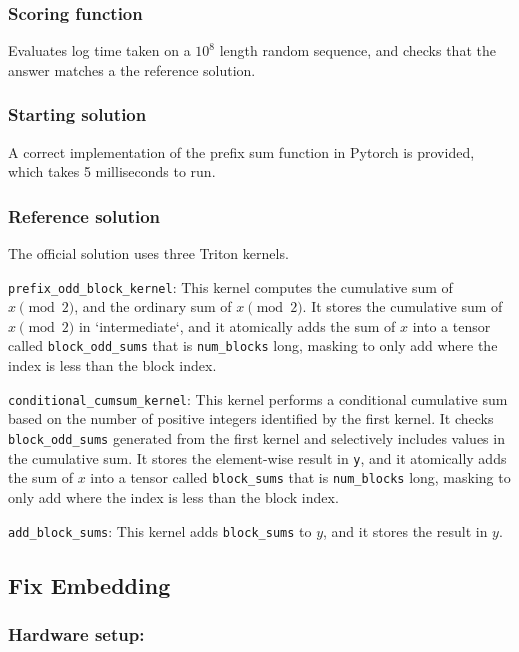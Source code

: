 \documentclass{article}
\begin{document}
\subsubsection{Scoring function}

Evaluates log time taken on a $10^8$ length random sequence, and checks that the answer matches a the reference solution.

\subsubsection{Starting solution}

A correct implementation of the prefix sum function in Pytorch is provided, which takes 5 milliseconds to run. 

\subsubsection{Reference solution}

The official solution uses three Triton kernels.

\verb|prefix_odd_block_kernel|: This kernel computes the cumulative sum of $x \pmod 2$, and the ordinary sum of $x \pmod 2$. It stores the cumulative sum of $x \pmod 2$ in `intermediate`, and it atomically adds the sum of $x$ into a tensor called \verb|block_odd_sums| that is \verb|num_blocks| long, masking to only add where the index is less than the block index.

\verb|conditional_cumsum_kernel|: This kernel performs a conditional cumulative sum based on the number of positive integers identified by the first kernel. It checks \verb|block_odd_sums| generated from the first kernel and selectively includes values in the cumulative sum. It stores the element-wise result in \verb|y|, and it atomically adds the sum of $x$ into a tensor called \verb|block_sums| that is \verb|num_blocks| long, masking to only add where the index is less than the block index.

\verb|add_block_sums|: This kernel adds \verb|block_sums| to $y$, and it stores the result in $y$.

\clearpage
\subsection{Fix Embedding}

\subsubsection{Hardware setup:}
\end{document}
